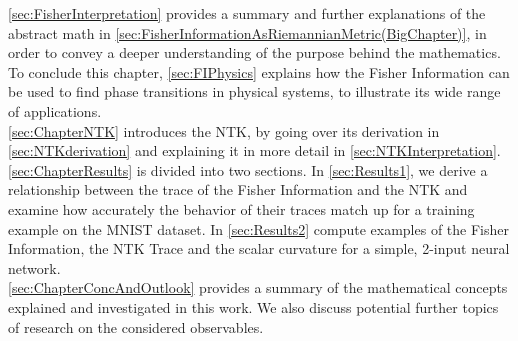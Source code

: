 \cref{sec:FisherInterpretation} provides a summary and further explanations of the abstract math in \cref{sec:FisherInformationAsRiemannianMetric(BigChapter)}, in order to convey a deeper understanding of the purpose behind the mathematics. To conclude this chapter, \cref{sec:FIPhysics} explains how the Fisher Information can be used to find phase transitions in physical systems, to illustrate its wide range of applications.\\
\cref{sec:ChapterNTK} introduces the NTK, by going over its derivation in \cref{sec:NTKderivation} and explaining it in more detail in \cref{sec:NTKInterpretation}.\\
\cref{sec:ChapterResults} is divided into two sections. In \cref{sec:Results1}, we derive a relationship between the trace of the Fisher Information and the NTK and examine how accurately the behavior of their traces match up for a training example on the MNIST dataset. In \cref{sec:Results2} compute examples of the Fisher Information, the NTK Trace and the scalar curvature for a simple, 2-input neural network.\\
\cref{sec:ChapterConcAndOutlook} provides a summary of the mathematical concepts explained and investigated in this work. We also discuss potential further topics of research on the considered observables.